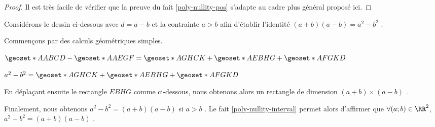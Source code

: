 \begin{proof}
	Il est très facile de vérifier que la preuve du fait \ref{poly-nullity-pos} s'adapte au cadre plus général proposé ici.
\end{proof}




\begin{example}
Considérons le dessin ci-dessous avec $d = a - b$ et la contrainte $a > b$ afin d'établir l'identité $(a+b)(a-b) = a^2 - b^2$ .


\smallskip

\begin{center}
\end{center}


\medskip


Commençons par des calculs géométriques simples.

\smallskip
	
$\geoset*{A}{ABCD} - \geoset*{A}{AEGF} = \geoset*{A}{GHCK} + \geoset*{A}{EBHG} + \geoset*{A}{FGKD}$
	
\smallskip
	
$a^2 - b^2 = \geoset*{A}{GHCK} + \geoset*{A}{EBHG} + \geoset*{A}{FGKD}$


\medskip

En déplaçant ensuite le rectangle $EBHG$ comme ci-dessous, nous obtenons alors un rectangle de dimension $(a+b) \times (a-b)$ . 
	

\smallskip

\begin{center}
\end{center}


\medskip

Finalement, nous obtenons $a^2 - b^2 = (a+b)(a-b)$ si $a > b$ .
Le fait \ref{poly-nullity-interval} permet alors d'affirmer que $\forall (a ;b) \in \RR^2$, $a^2 - b^2 = (a+b)(a-b)$ .
\end{example}
